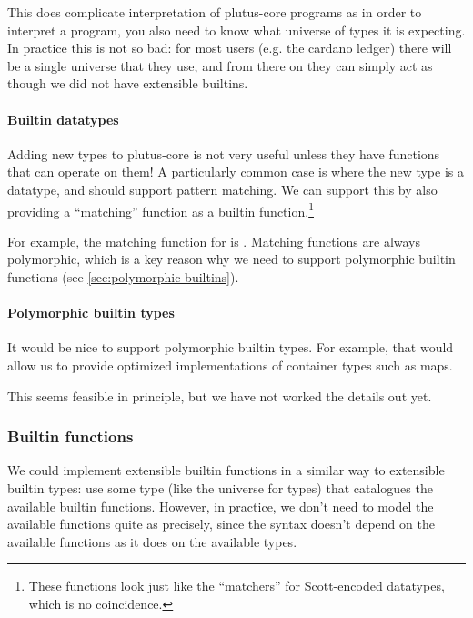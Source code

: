 This does complicate interpretation of \gls{plutus-core} programs as in order to interpret a program, you also need to know what universe of types it is expecting.
In practice this is not so bad: for most users (e.g. the \gls{cardano} ledger) there will be a single universe that they use, and from there on they can simply act as though we did not have extensible builtins.

\paragraph{Builtin datatypes}

Adding new types to \gls{plutus-core} is not very useful unless they have functions that can operate on them!
A particularly common case is where the new type is a datatype, and should support pattern matching.
We can support this by also providing a ``matching'' function as a builtin function.\footnote{
  These functions look just like the ``matchers'' for Scott-encoded datatypes, which is no coincidence.
}

For example, the matching function for  is .
Matching functions are always polymorphic, which is a key reason why we need to support polymorphic builtin functions (see \cref{sec:polymorphic-builtins}).

\paragraph{Polymorphic builtin types}

It would be nice to support polymorphic builtin types.
For example, that would allow us to provide optimized implementations of container types such as maps.

This seems feasible in principle, but we have not worked the details out yet.

\subsubsection{Builtin functions}

We could implement extensible builtin functions in a similar way to extensible builtin types: use some type (like the universe for types) that catalogues the available builtin functions.
However, in practice, we don't need to model the available functions quite as precisely, since the syntax doesn't depend on the available functions as it does on the available types.

